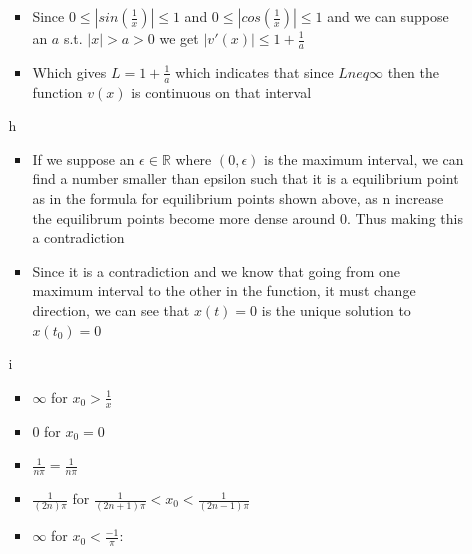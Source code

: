 \documentclass{article}
\begin{document}
\begin{enumerate}
\begin{enumerate}
\begin{itemize}
            \item Since $0 \leq |sin(\frac{1}{x})| \leq 1 $ and $0 \leq |cos(\frac{1}{x})| \leq 1 $ and we can suppose an $a$ s.t. $|x| > a > 0$ we get $|v'(x)| \leq 1 + \frac{1}{a}$ 
            \item Which gives $L = 1 + \frac{1}{a}$ which indicates that since $L neq \infty $ then the function $v(x)$ is continuous on that interval
        \end{itemize}
        \item [h] \begin{itemize}
            \item If we suppose an $\epsilon \in \mathbb{R}$ where $(0,\epsilon)$ is the maximum interval, we can find a number smaller than epsilon such that it is a equilibrium point as in the formula for equilibrium points shown above, as n increase the equilibrum points become more dense around 0. Thus making this a contradiction
            \item Since it is a contradiction and we know that going from one maximum interval to the other in the function, it must change direction, we can see that $x(t) = 0 $ is the unique solution to $x(t_0) = 0 $
        \end{itemize}
        \item [i] \begin{itemize}
            \item $\infty$ for $x_0 > \frac{1}{x}$  
            \item $0$ for $x_0 = 0$
            \item $\frac{1}{n\pi} = \frac{1}{n\pi} $
            \item $\frac{1}{(2n) \pi} $ for $\frac{1}{(2n+1)\pi} < x_0 < \frac{1}{(2n -1)\pi} $
            \item $ \infty $ for $x_0 < \frac{-1}{\pi}$: 
        \end{itemize}
    \end{enumerate}
\end{enumerate}
\end{document}
